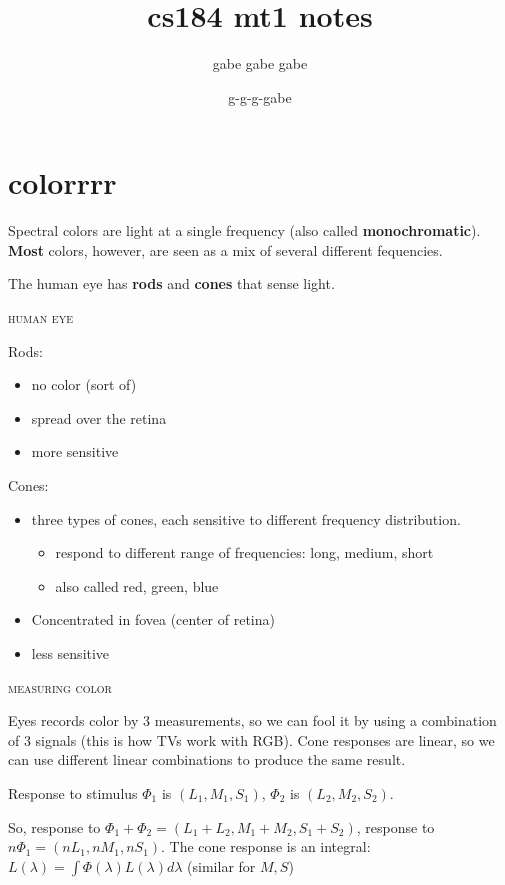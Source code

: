 \documentclass{article}
\title{cs184 mt1 notes}
\author{gabe gabe gabe}
\date{g-g-g-gabe}
\begin{document}
\maketitle

\section{colorrrr} %
\label{sec:colorrrr}

Spectral colors are light at a single frequency (also called {\bf monochromatic}). {\bf Most} colors, however, are seen as a mix of several different fequencies.

The human eye has {\bf rods} and {\bf cones} that sense light.
\begin{center}\textsc{human eye}\end{center} 
Rods:
\begin{itemize}
	\item no color (sort of)
	\item spread over the retina
	\item more sensitive
\end{itemize}

Cones:
\begin{itemize}
	\item three types of cones, each sensitive to different frequency distribution.
	\begin{itemize}
		\item respond to different range of frequencies: long, medium, short
		\item also called red, green, blue
	\end{itemize}
	\item Concentrated in fovea (center of retina)
	\item less sensitive
\end{itemize}

\begin{center}\textsc{measuring color}\end{center} 
Eyes records color by 3 measurements, so we can fool it by using a combination of 3 signals (this is how TVs work with RGB). Cone responses are linear, so we can use different linear combinations to produce the same result.

Response to stimulus $\Phi_1$ is $(L_1,M_1,S_1)$, $\Phi_2$ is $(L_2,M_2,S_2)$.

So, response to $\Phi_1+\Phi_2 = (L_1+L_2,M_1+M_2,S_1+S_2)$, response to $n\Phi_1 = (nL_1,nM_1,nS_1)$. The cone response is an integral: $L(\lambda)=\int \Phi(\lambda)L(\lambda)d\lambda$ (similar for $M,S$)
\end{document}
